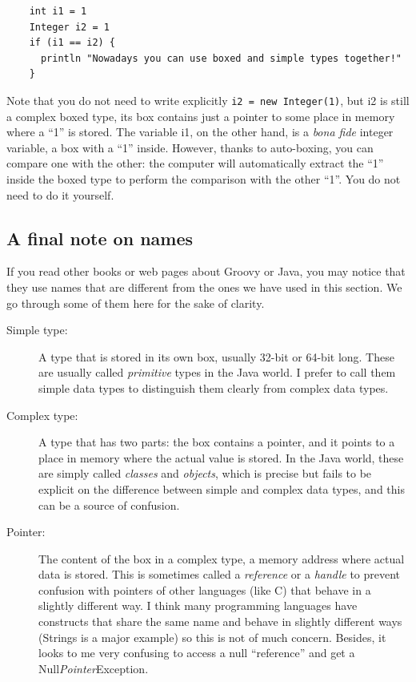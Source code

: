 \begin{verbatim}
    int i1 = 1
    Integer i2 = 1
    if (i1 == i2) {
      println "Nowadays you can use boxed and simple types together!"
    }
\end{verbatim}

Note that you do not need to write 
explicitly \verb+i2 = new Integer(1)+, but i2 is still a complex boxed
type, its box contains just a pointer to some place in memory where a
``1'' is stored. The variable i1, on the other hand, is a \emph{bona
  fide} integer variable, a box with a ``1'' inside. However, thanks
to auto-boxing, you can compare one with the other: the computer will
automatically extract the ``1'' inside the boxed type to perform the
comparison with the other ``1''. You do not need to do it yourself. 

\subsection{A final note on names}
\label{sec:final-note-name}

If you read other books or web pages about Groovy or Java, you may
notice that they use names that are different from the ones we have
used in this section. We go through some of them here for the sake of
clarity. 

\begin{description}
\item[Simple type: ] A type that is stored in its own box, usually
  32-bit or 64-bit long. These are usually called \emph{primitive}
  types in the Java world. I prefer to call them simple data types to
  distinguish them clearly from complex data types.
\item[Complex type: ] A type that has two parts: the box contains a
  pointer, and it points to a place in memory where the actual value
  is stored. In the Java world, these are simply called \emph{classes}
  and \emph{objects}, which is precise but fails to be explicit on the
  difference between simple and complex data types, and this can be a
  source of confusion.
\item[Pointer: ] The content of the box in a complex type, a memory
  address where actual data is stored. This is sometimes called a
  \emph{reference} or a \emph{handle} to prevent confusion with
  pointers of other languages (like C) that behave in a slightly
  different way. I think many programming languages have constructs
  that share the same name and behave in slightly different ways
  (Strings is a major example) so this is not of much
  concern. Besides, it looks to me very confusing to access a null
  ``reference'' and get a Null\emph{Pointer}Exception.
\end{description}





